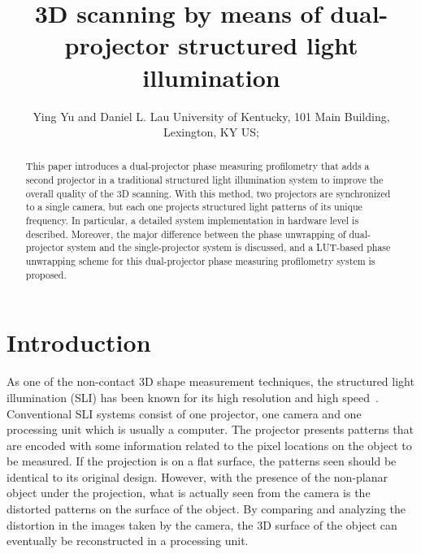 \documentclass[]{spie}  %
\title{3D scanning by means of dual-projector structured light illumination}
\author{Ying Yu\supit{a} and Daniel L. Lau\supit{a}
\skiplinehalf
\supit{a}University of Kentucky, 101 Main Building, Lexington, KY US; \\
}
\begin{document}
 
  \maketitle 

\begin{abstract}
This paper introduces a dual-projector phase measuring profilometry that adds a second projector in a traditional structured light illumination system to improve the overall quality of the 3D scanning. With this method, two projectors are synchronized to a single camera, but each one projects structured light patterns of its unique frequency. In particular, a detailed system implementation in hardware level is described. Moreover, the major difference between the phase unwrapping of dual-projector system and the single-projector system is discussed, and a LUT-based phase unwrapping scheme for this dual-projector phase measuring profilometry system is proposed. 
\end{abstract}



\section{Introduction}
\label{sec:intro}  %
As one of the non-contact 3D shape measurement techniques, the structured light illumination (SLI) has been known for its high resolution and high speed~\cite{chen00}. Conventional SLI systems consist of one projector, one camera and one processing unit which is usually a computer. The projector presents patterns that are encoded with some information related to the pixel locations on the object to be measured. If the projection is on a flat surface, the patterns seen should be identical to its original design. However, with the presence of the non-planar object under the projection, what is actually seen from the camera is the distorted patterns on the surface of the object. By comparing and analyzing the distortion in the images taken by the camera, the 3D surface of the object can eventually be reconstructed in a processing unit.
\end{document}

